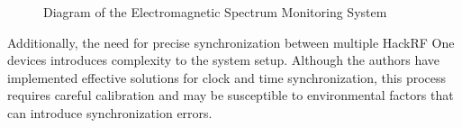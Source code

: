 \begin{itemize}
	\begin{figure}[h!]
		\centering
		\caption{Diagram of the Electromagnetic Spectrum Monitoring System}
	\end{figure}
	Additionally, the need for precise synchronization between multiple HackRF One devices introduces complexity to the system setup. Although the authors have implemented effective solutions for clock and time synchronization, this process requires careful calibration and may be susceptible to environmental factors that can introduce synchronization errors.
	

\end{itemize}
